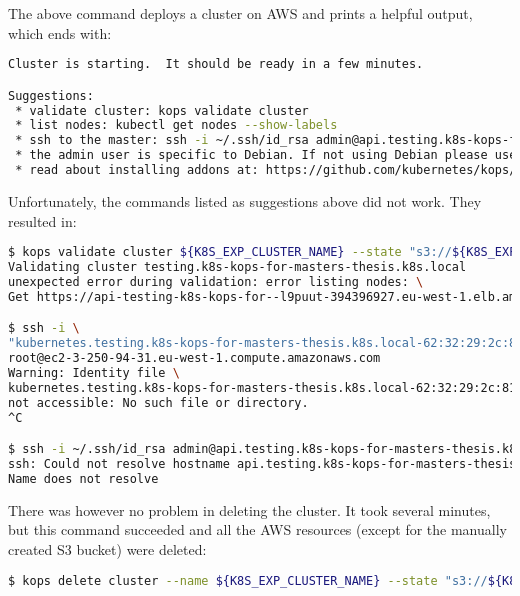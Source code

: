The above command deploys a cluster on AWS and prints a helpful output, which ends with:
\begin{lstlisting}[basicstyle=\small,caption={Output from the command: kops update cluster},captionpos=b,language=Bash,xleftmargin=1cm]
Cluster is starting.  It should be ready in a few minutes.

Suggestions:
 * validate cluster: kops validate cluster
 * list nodes: kubectl get nodes --show-labels
 * ssh to the master: ssh -i ~/.ssh/id_rsa admin@api.testing.k8s-kops-for-masters-thesis.k8s.local
 * the admin user is specific to Debian. If not using Debian please use the appropriate user based on your OS.
 * read about installing addons at: https://github.com/kubernetes/kops/blob/master/docs/operations/addons.md.
\end{lstlisting}

Unfortunately, the commands listed as suggestions above did not work. They resulted in:
\begin{lstlisting}[basicstyle=\tiny,caption={Running commands to connect with a cluster created by Kops together with returned output},captionpos=b,language=Bash,xleftmargin=1cm]
$ kops validate cluster ${K8S_EXP_CLUSTER_NAME} --state "s3://${K8S_EXP_KOPS_S3_BUCKET}"
Validating cluster testing.k8s-kops-for-masters-thesis.k8s.local
unexpected error during validation: error listing nodes: \
Get https://api-testing-k8s-kops-for--l9puut-394396927.eu-west-1.elb.amazonaws.com/api/v1/nodes: EOF

$ ssh -i \
"kubernetes.testing.k8s-kops-for-masters-thesis.k8s.local-62:32:29:2c:81:d1:4f:85:f7:0a:57:3c:db:22:bd:85.pem" \
root@ec2-3-250-94-31.eu-west-1.compute.amazonaws.com
Warning: Identity file \
kubernetes.testing.k8s-kops-for-masters-thesis.k8s.local-62:32:29:2c:81:d1:4f:85:f7:0a:57:3c:db:22:bd:85.pem \
not accessible: No such file or directory.
^C

$ ssh -i ~/.ssh/id_rsa admin@api.testing.k8s-kops-for-masters-thesis.k8s.local
ssh: Could not resolve hostname api.testing.k8s-kops-for-masters-thesis.k8s.local: \
Name does not resolve
\end{lstlisting}

There was however no problem in deleting the cluster. It took several minutes, but this command succeeded and all the AWS resources (except for the manually created S3 bucket) were deleted:

\begin{lstlisting}[basicstyle=\small,caption={Command used to delete a Kubernetes cluster created with Kops},captionpos=b,language=Bash,xleftmargin=1cm]
$ kops delete cluster --name ${K8S_EXP_CLUSTER_NAME} --state "s3://${K8S_EXP_KOPS_S3_BUCKET}" --yes
\end{lstlisting}


